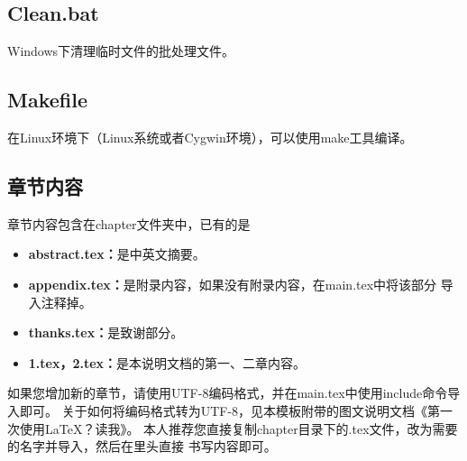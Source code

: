 \subsection{Clean.bat}
Windows下清理临时文件的批处理文件。

\subsection{Makefile}
在Linux环境下（Linux系统或者Cygwin环境），可以使用make工具编译。

\subsection{章节内容}
章节内容包含在chapter文件夹中，已有的是
\begin{itemize}
\itemsep=0pt \parskip=0pt
\item \textbf{abstract.tex：}是中英文摘要。
\item \textbf{appendix.tex：}是附录内容，如果没有附录内容，在main.tex中将该部分%
    导入注释掉。%
\item \textbf{thanks.tex：}是致谢部分。
\item \textbf{1.tex，2.tex：}是本说明文档的第一、二章内容。
\end{itemize}

如果您增加新的章节，请使用UTF-8编码格式，并在main.tex中使用include命令导入即可。%
关于如何将编码格式转为UTF-8，见本模板附带的图文说明文档《第一次使用LaTeX？读我》。%
本人推荐您直接复制chapter目录下的.tex文件，改为需要的名字并导入，然后在里头直接%
书写内容即可。
